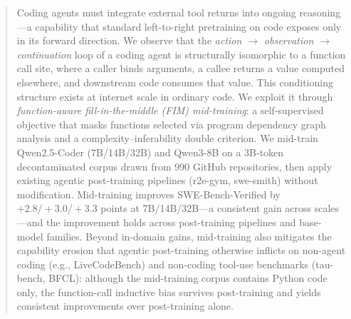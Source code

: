 
\begin{abstract}
Coding agents must integrate external tool returns into ongoing reasoning---a
capability that standard left-to-right pretraining on code exposes only in its
forward direction. We observe that the
\textit{action $\rightarrow$ observation $\rightarrow$ continuation} loop of a
coding agent is structurally isomorphic to a function call site, where a
caller binds arguments, a callee returns a value computed elsewhere, and
downstream code consumes that value. This conditioning structure exists at
internet scale in ordinary code. We exploit it through
\emph{function-aware fill-in-the-middle (FIM) mid-training}: a self-supervised
objective that masks functions selected via program dependency graph
analysis and a complexity--inferability double criterion. We mid-train
Qwen2.5-Coder (7B/14B/32B) and Qwen3-8B on a 3B-token decontaminated corpus
drawn from 990 GitHub repositories, then apply existing agentic post-training
pipelines (r2e-gym, swe-smith) without modification. Mid-training improves
SWE-Bench-Verified by $+2.8/+3.0/+3.3$ points at 7B/14B/32B---a consistent
gain across scales---and the improvement holds across post-training pipelines
and base-model families. Beyond in-domain gains, mid-training also mitigates
the capability erosion that agentic post-training otherwise inflicts on
non-agent coding (e.g., LiveCodeBench) and non-coding tool-use benchmarks
(tau-bench, BFCL): although the mid-training corpus contains Python code
only, the function-call inductive bias survives post-training and yields
consistent improvements over post-training alone.
\end{abstract}
